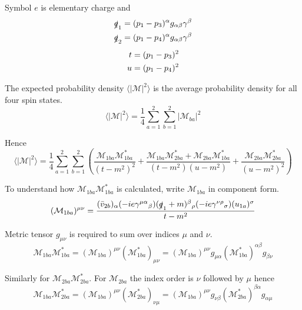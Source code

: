 Symbol $e$ is elementary charge and
\begin{gather*}
\begin{aligned}
\slashed q_1&=(p_1-p_3)^\alpha g_{\alpha\beta}\gamma^\beta
\\
\slashed q_2&=(p_1-p_4)^\alpha g_{\alpha\beta}\gamma^\beta
\end{aligned}
\\[1ex]
\begin{aligned}
t&=(p_1-p_3)^2
\\
u&=(p_1-p_4)^2
\end{aligned}
\end{gather*}

The expected probability density $\langle|\mathcal M|^2\rangle$
is the average probability density for all four spin states.
\begin{equation*}
\langle|\mathcal M|^2\rangle=\frac{1}{4}\sum_{a=1}^2\sum_{b=1}^2|\mathcal M_{ba}|^2
\end{equation*}

Hence
\begin{equation*}
\langle|\mathcal{M}|^2\rangle
=\frac{1}{4}\sum_{a=1}^2\sum_{b=1}^2
\left(
\frac{\mathcal M_{1ba}\mathcal M_{1ba}^*}{(t-m^2)^2}
+\frac{\mathcal M_{1ba}\mathcal M_{2ba}^*+\mathcal M_{2ba}\mathcal M_{1ba}^*}{(t-m^2)(u-m^2)}
+\frac{\mathcal M_{2ba}\mathcal M_{2ba}^*}{(u-m^2)^2}
\right)
\end{equation*}

To understand how $\mathcal M_{1ba}\mathcal M_{1ba}^*$ is calculated,
write $\mathcal M_{1ba}$ in component form.
\begin{equation*}
(\mathcal M_{1ba})^{\mu\nu}=\frac{
(\bar{v}_{2b})_\alpha
(-ie\gamma^{\mu\alpha}{}_\beta)
(\slashed q_1+m)^\beta{}_\rho
(-ie\gamma^{\nu\rho}{}_\sigma)
(u_{1a})^\sigma}{t-m^2}
\end{equation*}

Metric tensor $g_{\mu\nu}$ is required to sum over indices $\mu$ and $\nu$.
\begin{equation*}
\mathcal M_{1ba}\mathcal M_{1ba}^*=(\mathcal M_{1ba})^{\mu\nu}(\mathcal M_{1ba}^*)_{\mu\nu}
=(\mathcal M_{1ba})^{\mu\nu}g_{\mu\alpha}(\mathcal M_{1ba}^*)^{\alpha\beta}g_{\beta\nu}
\end{equation*}

Similarly for $\mathcal M_{2ba}\mathcal M_{2ba}^*$.
For $\mathcal M_{2ba}$ the index order is $\nu$ followed by $\mu$ hence
\begin{equation*}
\mathcal M_{1ba}\mathcal M_{2ba}^*=(\mathcal M_{1ba})^{\mu\nu}(\mathcal M_{2ba}^*)_{\nu\mu}
=(\mathcal M_{1ba})^{\mu\nu}g_{\nu\beta}(\mathcal M_{2ba}^*)^{\beta\alpha}g_{\alpha\mu}
\end{equation*}

